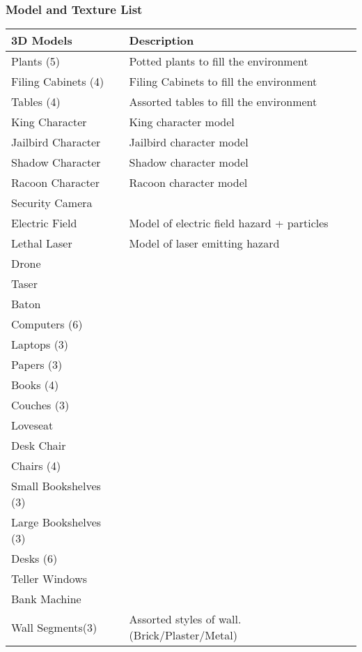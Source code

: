 \documentclass[11pt]{report}
\begin{document}
\subsubsection{Model and Texture List}

\begin{tabular}{| p{.45\linewidth} | p{.45\linewidth} |}
    \hline    
    3D Models   & Description  \\ \hline
    Plants (5)  &   Potted plants to fill the environment \\ \hline
    Filing Cabinets (4) &  Filing Cabinets to fill the environment \\ \hline
    Tables (4)  &  Assorted tables to fill the environment \\ \hline
    King Character  &  King character model \\ \hline
    Jailbird Character  &  Jailbird character model \\ \hline
    Shadow Character    &  Shadow character model \\ \hline
    Racoon Character    &  Racoon character model \\ \hline
    Security Camera &   \\ \hline
    Electric Field  &  Model of electric field hazard + particles \\ \hline
    Lethal Laser    &  Model of laser emitting hazard \\ \hline
    Drone   &  \\ \hline
    Taser   &  \\ \hline
    Baton   &  \\ \hline
    Computers (6)   &  \\ \hline
    Laptops (3) &  \\ \hline
    Papers (3)  &  \\ \hline
    Books (4)   &  \\ \hline
    Couches (3)  &  \\ \hline
    Loveseat    &  \\ \hline
    Desk Chair  &  \\ \hline
    Chairs (4)  &  \\ \hline
    Small Bookshelves (3)   &  \\ \hline
    Large Bookshelves (3)   &  \\ \hline
    Desks (6)   &  \\ \hline
    Teller Windows  &  \\ \hline
    Bank Machine    &  \\ \hline
    Wall Segments(3)    & Assorted styles of wall. (Brick/Plaster/Metal) \\
    \hline
\end{tabular}
\end{document}

